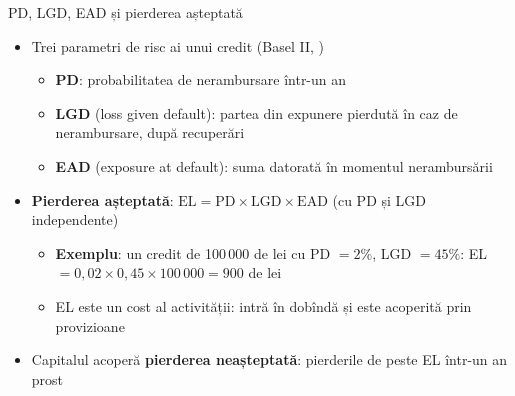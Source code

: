 \begin{frame}{PD, LGD, EAD și pierderea așteptată}
\itemsize{\small}
\begin{itemize}
    \item Trei parametri de risc ai unui credit (Basel II, )
    \begin{itemize}
        \item \textbf{PD}: probabilitatea de nerambursare într-un an
        \item \textbf{LGD} (loss given default): partea din expunere pierdută în caz de nerambursare, după recuperări
        \item \textbf{EAD} (exposure at default): suma datorată în momentul nerambursării
    \end{itemize}
    \item \textbf{Pierderea așteptată}: $\mathrm{EL} = \mathrm{PD} \times \mathrm{LGD} \times \mathrm{EAD}$ (cu PD și LGD independente)
    \begin{itemize}
        \item \textbf{Exemplu}: un credit de 100\,000 de lei cu PD $= 2\%$, LGD $= 45\%$: EL $= 0{,}02 \times 0{,}45 \times 100\,000 = 900$ de lei
        \item EL este un cost al activității: intră în dobîndă și este acoperită prin provizioane
    \end{itemize}
    \item Capitalul acoperă \textbf{pierderea neașteptată}: pierderile de peste EL într-un an prost
\end{itemize}
\end{frame}

